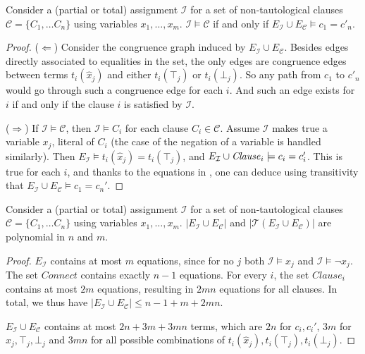 \documentclass[smallextended]{svjour3}
\begin{document}
\begin{lemma}
\label{lemma:eqv}
Consider a (partial or total) assignment $\mathcal{I}$ for a set of
non-tautological clauses $\mathcal{C}= \{C_1, \dots C_n\}$ using variables
$x_1,\ldots, x_m$.  $\mathcal{I} \models \mathcal{C}$ if and only if
$E_{\mathcal{I}} \cup E_\mathcal{C} \models c_1 = c'_n$.
\end{lemma}
\begin{proof}
($\Leftarrow$)  Consider the congruence graph induced by
$E_{\mathcal{I}} \cup E_\mathcal{C}$.  Besides edges directly associated to
equalities in the set, the only edges are congruence edges between terms
$t_i(\hat{x}_j)$ and either $t_i(\top_j)$ or $t_i(\bot_j)$.  So any path from
$c_1$ to $c'_n$ would go through such a congruence edge for each $i$.
And such an edge exists for $i$ if and only if the clause $i$ is satisfied by
$\mathcal{I}$.

($\Rightarrow$)  If $\mathcal{I} \models \mathcal{C}$, then
$\mathcal{I} \models C_i$ for each clause $C_i \in \mathcal{C}$.  Assume
$\mathcal{I}$ makes true a variable $x_j$, literal of $C_i$ (the case of
the negation of a variable is handled similarly).  Then $E_{\mathcal{I}} \models
t_i(\hat{x}_j) = t_i(\top_j)$, and $E_{\mathcal{I}} \cup {\it Clause}_i
\models c_i = c_i'$.  This is true for each $i$, and
thanks to the equations in \Connect, one can deduce using transitivity that
$E_{\mathcal{I}} \cup E_\mathcal{C} \models c_1 = c_n'$.

\end{proof}

\begin{lemma}
Consider a (partial or total) assignment $\mathcal{I}$ for a set of
non-tautological clauses $\mathcal{C}= \{C_1, \dots C_n\}$ using variables
$x_1,\ldots, x_m$. $|E_{\mathcal{I}} \cup E_\mathcal{C}|$ and
$|\mathcal{T}(E_{\mathcal{I}} \cup E_\mathcal{C})|$ are polynomial in $n$ and
$m$.

\begin{proof}
$E_{\mathcal{I}}$ contains at most $m$ equations, since for no $j$ both $\mathcal{I} \models x_j$ and $\mathcal{I} \models \neg x_j$.
The set $Connect$ contains exactly $n-1$ equations.
For every $i$, the set $Clause_i$ contains at most $2m$ equations, resulting in $2mn$ equations for all clauses.
In total, we thus have $|E_{\mathcal{I}} \cup E_\mathcal{C}| \leq n-1 + m + 2mn$.

$E_{\mathcal{I}} \cup E_\mathcal{C}$ contains at most $2n + 3m + 3mn$ terms, which are $2n$ for $c_i,c_i'$, $3m$ for $\hat{x}_j,\top_j,\bot_j$ and $3mn$ for all possible combinations of $t_i(\hat{x}_j),t_i(\top_j),t_i(\bot_j)$.
\end{proof}
\end{lemma}
\end{document}

